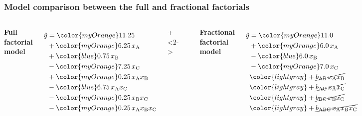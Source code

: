\documentclass[handout,11pt,aspectratio=169,mathserif]{beamer}
\begin{document}
\begin{frame}\frametitle{Model comparison between the full and fractional factorials}
	\begin{columns}[T]
			\begin{center}\textbf{Full factorial model}\end{center}
			
				
				\begin{align*}
					\hat{y} &= {\color{myOrange}11.25}\\
							&+ {\color{myOrange}6.25\,}x_\text{A}\\
							&+ {\color{blue}0.75\,}x_\text{B}\\
							&- {\color{myOrange}7.25\,}x_\text{C}\\
							&+ {\color{myOrange}0.25\,}x_\text{A}x_\text{B}\\
							&- {\color{blue}6.75\,}x_\text{A}x_\text{C}\\
							&- {\color{myOrange}0.25\,}x_\text{B}x_\text{C}\\
							&- {\color{myOrange}0.25\,}x_\text{A}x_\text{B}x_\text{C}		
				\end{align*}
			
		\onslide+<2->	{
			\rule[3mm]{0.03cm}{65mm}
			\begin{center}\textbf{Fractional factorial model}\end{center}
				
				\begin{align*}
					\hat{y} &= {\color{myOrange}11.0}\\
							&+ {\color{myOrange}6.0\,}x_\text{A}\\
							&- {\color{blue}6.0\,}x_\text{B}\\
							&- {\color{myOrange}7.0\,}x_\text{C}\\
							& \color{lightgray}+ \cancel{b_\text{AB}\,x_\text{A}x_\text{B}}\\
							& \color{lightgray}+ \cancel{b_\text{AC}\,x_\text{A}x_\text{C}}\\
							& \color{lightgray}+ \cancel{b_\text{BC}\,x_\text{B}x_\text{C}}\\
							& \color{lightgray}+ \cancel{b_\text{ABC}\,x_\text{A}x_\text{B}x_\text{C}}\\
				\end{align*}
				}
	\end{columns}
\end{frame}
\end{document}
